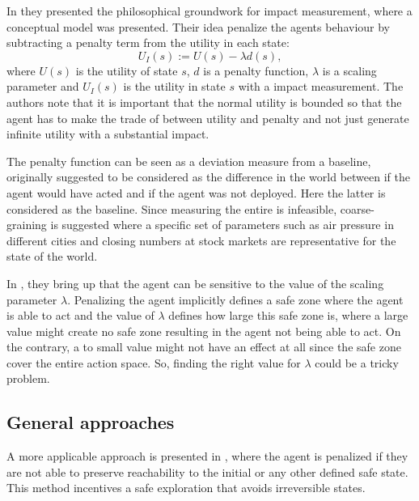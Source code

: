 \documentclass[12pt,A4]{report}
\theoremstyle{definition}
\begin{document}

In \autocite{Armstrong and Levinstein} they presented the philosophical groundwork for impact measurement, where a conceptual model was presented. Their idea penalize the agents behaviour by subtracting a penalty term from the utility in each state:
\[ U_I(s) := U(s) - \lambda d(s),\]
where $U(s)$ is the utility of state $s$, $d$ is a penalty function, $\lambda$ is a scaling parameter and $U_I(s)$ is the utility in state $s$ with a impact measurement. The authors note that it is important that the normal utility is bounded so that the agent has to make the trade of between utility and penalty and not just generate infinite utility with a substantial impact. 

The penalty function can be seen as a deviation measure from a baseline\autocite{Krakovna 2020}, originally suggested to be considered as the difference in the world between if the agent would have acted and if the agent was not deployed. Here the latter is considered as the baseline. Since measuring the entire  is infeasible, coarse-graining is suggested where a specific set of parameters such as air pressure in different cities and closing numbers at stock markets are representative for the state of the world. 

In \autocite{Armstrong and Levinstein}, they bring up that the agent can be sensitive to the value of the scaling parameter $\lambda$. Penalizing the agent implicitly defines a safe zone where the agent is able to act and the value of $\lambda$ defines how large this safe zone is, where a large value might create no safe zone resulting in the agent not being able to act. On the contrary, a to small value might not have an effect at all since the safe zone cover the entire action space. So, finding the right value for $\lambda$ could be a tricky problem. 

\subsection{General approaches}
A more applicable approach is presented in \autocite{Eysenbach et al}, where the agent is penalized if they are not able to preserve reachability to the initial or any other defined safe state. This method incentives a safe exploration that avoids irreversible states.
\end{document}
